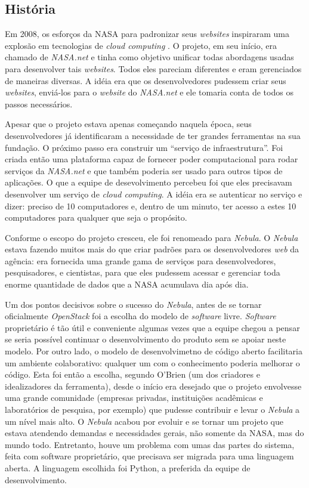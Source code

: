 \subsection{História}

Em 2008, os esforços da NASA para padronizar seus \emph{websites} inspiraram
uma explosão em tecnologias de \emph{cloud computing} \cite{nasa-cloud-computing}.
O projeto, em seu início, era chamado de \emph{NASA.net} e tinha como objetivo
unificar todas abordagens usadas para desenvolver tais \emph{websites}. Todos eles
pareciam diferentes e eram gerenciados de maneiras diversas. A idéia era
que os desenvolvedores pudessem criar seus \emph{websites}, enviá-los para o
\emph{website} do \emph{NASA.net} e ele tomaria conta de todos os passos necessários.

Apesar que o projeto estava apenas começando naquela época, seus desenvolvedores
já identificaram a necessidade de ter grandes ferramentas na sua fundação. O próximo
passo era construir um ``serviço de infraestrutura''. Foi criada então uma plataforma
capaz de fornecer poder computacional para rodar serviços da \emph{NASA.net} e que
também poderia ser usado para outros tipos de aplicações. O que a equipe de desevolvimento
percebeu foi que eles precisavam desenvolver um serviço de \emph{cloud computing}.
A idéia era se autenticar no serviço e dizer: preciso de 10 computadores e,
dentro de um minuto, ter acesso a estes 10 computadores para qualquer que seja
o propósito.

Conforme o escopo do projeto cresceu, ele foi renomeado para \emph{Nebula}. O \emph{Nebula}
estava fazendo muitos mais do que criar padrões para os desenvolvedores \emph{web}
da agência: era fornecida uma grande gama de serviços para desenvolvedores, pesquisadores,
e cientistas, para que eles pudessem acessar e gerenciar toda enorme quantidade de
dados que a NASA acumulava dia após dia.

Um dos pontos decisivos sobre o sucesso do \emph{Nebula}, antes de se tornar
oficialmente \emph{OpenStack} foi a escolha do modelo de \emph{software} livre.
\emph{Software} proprietário é tão útil e conveniente algumas vezes que a equipe
chegou a pensar se seria possível continuar o desenvolvimento do produto sem se
apoiar neste modelo. Por outro lado, o modelo de desenvolvimetno de código aberto facilitaria
um ambiente colaborativo: qualquer um com o conhecimento poderia melhorar o código. Esta
foi então a escolha, segundo O'Brien (um dos criadores e idealizadores da ferramenta),
desde o início era desejado que o projeto envolvesse uma grande comunidade (empresas
privadas, instituições acadêmicas e laboratórios de pesquisa, por exemplo) que
pudesse contribuir e levar o \emph{Nebula} a um nível mais alto.
O \emph{Nebula} acabou por evoluir e se tornar um projeto que estava atendendo
demandas e necessidades gerais, não somente da NASA, mas do mundo todo. Entretanto,
houve um problema com umas das partes do sistema, feita com software proprietário,
que precisava ser migrada para uma linguagem aberta. A linguagem escolhida foi Python, a
preferida da equipe de desenvolvimento.

